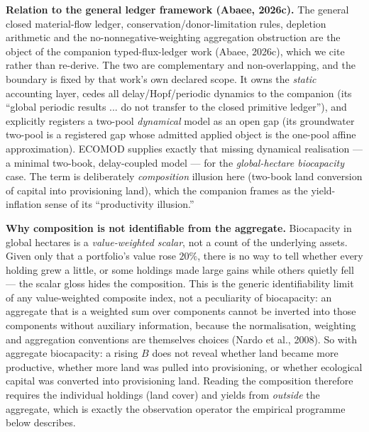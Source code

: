 \documentclass[11pt]{article}
\begin{document}
\noindent\textbf{Relation to the general ledger framework (Abaee, 2026c).} The general closed material-flow ledger,
conservation/donor-limitation rules, depletion arithmetic and the no-nonnegative-weighting aggregation
obstruction are the object of the companion typed-flux-ledger work (Abaee, 2026c), which we cite rather than
re-derive. The two are complementary and non-overlapping, and the boundary is fixed by that work's own
declared scope. It owns the \emph{static} accounting layer, cedes all delay/Hopf/periodic dynamics to the
companion (its ``global periodic results ... do not transfer to the closed primitive ledger''), and explicitly
registers a two-pool \emph{dynamical} model as an open gap (its groundwater two-pool is a registered gap whose
admitted applied object is the one-pool affine approximation). ECOMOD supplies exactly that missing dynamical
realisation --- a minimal two-book, delay-coupled model --- for the \emph{global-hectare biocapacity} case.
The term is deliberately \emph{composition} illusion here (two-book land conversion of capital into
provisioning land), which the companion frames as the yield-inflation sense of its ``productivity illusion.''

\noindent\textbf{Why composition is not identifiable from the aggregate.} Biocapacity in global hectares is a
\emph{value-weighted scalar}, not a count of the underlying assets. Given only that a portfolio's value
rose $20\%$, there is no way to tell whether every holding grew a little, or some holdings made large gains while others
quietly fell --- the scalar gloss hides the composition. This is the generic identifiability limit of any
value-weighted composite index, not a peculiarity of biocapacity: an aggregate that is a
weighted sum over components cannot be inverted into those components without auxiliary information, because
the normalisation, weighting and aggregation conventions are themselves choices (Nardo et al., 2008). So with
aggregate biocapacity: a rising $B$ does not reveal
whether land became more productive, whether more land was pulled into provisioning, or whether ecological
capital was converted into provisioning land. Reading the composition therefore requires the individual holdings
(land cover) and yields from \emph{outside} the aggregate, which is exactly the observation operator the empirical
programme below describes.
\end{document}
